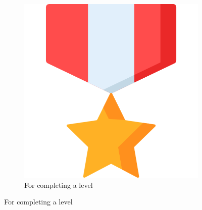 \documentclass[12 pct]{report}
\begin{document}
 \begin{figure}[H]
  \centering
  \begin{subfigure}[b]{0.3\linewidth}
    \includegraphics[width=\linewidth]{ArRobotCodeAchiv1}
     \caption{For completing a level}
     

\end{subfigure}
\end{figure}
\end{document}
